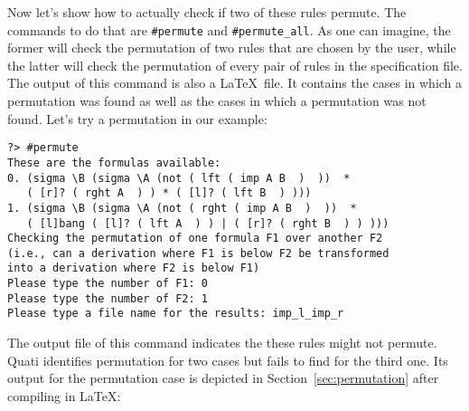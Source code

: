 \documentclass{llncs}
\begin{document}
Now let's show how to actually check if two of these rules permute. The commands
to do that are \texttt{\#permute} and \texttt{\#permute\_all}. As one can
imagine, the former will check the permutation of two rules that are chosen by
the user, while the latter will check the permutation of every pair of rules in
the specification file. The output of this command is also a \LaTeX\ file. It
contains the cases in which a permutation was found as well as the cases in
which a permutation was not found. Let's try a permutation in our example:
\vspace{-1mm}

{\small
\begin{verbatim}
?> #permute
These are the formulas available: 
0. (sigma \B (sigma \A (not ( lft ( imp A B  )  ))  * 
   ( [r]? ( rght A  ) ) * ( [l]? ( lft B  ) )))
1. (sigma \B (sigma \A (not ( rght ( imp A B  )  ))  * 
   ( [l]bang ( [l]? ( lft A  ) ) | ( [r]? ( rght B  ) ) )))
Checking the permutation of one formula F1 over another F2 
(i.e., can a derivation where F1 is below F2 be transformed 
into a derivation where F2 is below F1) 
Please type the number of F1: 0
Please type the number of F2: 1
Please type a file name for the results: imp_l_imp_r
\end{verbatim}
}

The output file of this command indicates the these rules might not permute.
Quati identifies permutation for two cases but fails to find for the third one.
Its output for the permutation case is depicted in Section~\ref{sec:permutation} 
after compiling in \LaTeX:

\begin{landscape}

\end{landscape}

%
\end{document}
